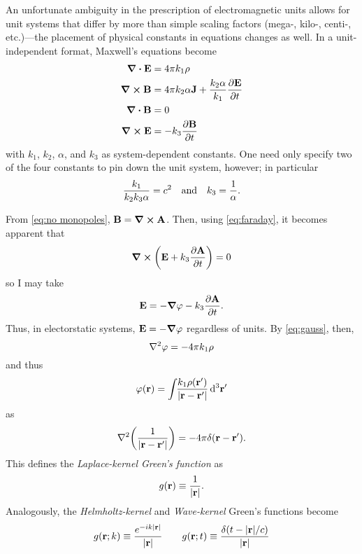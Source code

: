 An unfortunate ambiguity in the prescription of electromagnetic units allows for unit systems that differ by more than simple scaling factors (mega-, kilo-, centi-, etc.)---the placement of physical constants in equations changes as well.
In a unit-independent format, Maxwell's equations become~\cite{jackson2007classical}
\begin{subequations}
  \begin{align}
    \div{\vb{E}} &= 4 \pi k_1 \rho \label{eq:gauss} \\
    \curl{\vb{B}} &= 4 \pi k_2 \alpha \vb{J} + \frac{k_2 \alpha}{k_1} \pdv{\vb{E}}{t} \label{eq:ampere}\\
    \div{\vb{B}} &= 0 \label{eq:no monopoles} \\
    \curl{\vb{E}} &= - k_3 \pdv{\vb{B}}{t} \label{eq:faraday}
  \end{align}
  \label{eq:time-domain maxwell equations}
\end{subequations}
with $k_1$, $k_2$, $\alpha$, and $k_3$ as system-dependent constants. 
One need only specify two of the four constants to pin down the unit system, however; in particular 
\begin{equation}
  \frac{k_1}{k_2 k_3 \alpha} = c^2 \qq{and} k_3 = \frac{1}{\alpha}.
\end{equation}

From \cref{eq:no monopoles}, $\vb{B} = \curl{\vb{A}}$. 
Then, using \cref{eq:faraday}, it becomes apparent that
\begin{equation*}
  \curl{\qty(\vb{E} + k_3 \pdv{\vb{A}}{t})} = 0
\end{equation*}
so I may take
\begin{equation*}
  \vb{E} = -\grad{\varphi} - k_3 \pdv{\vb{A}}{t}.
\end{equation*}
Thus, in electorstatic systems, $\vb{E} = -\grad{\varphi}$ regardless of units.
By \cref{eq:gauss}, then,
\begin{equation*}
  \laplacian \varphi = -4 \pi k_1 \rho
\end{equation*}
and thus
\begin{equation*}
  \varphi(\vb{r}) = \int_{} \kern0.1em \frac{k_1 \rho(\vb{r}')}{\abs{\vb{r} - \vb{r}'}} \dd[3]{\vb{r}'}
\end{equation*}
as
\begin{equation*}
  \laplacian \qty(\frac{1}{\abs{\vb{r} - \vb{r}'}}) = -4 \pi \delta(\vb{r} - \vb{r}').
\end{equation*}
This defines the \emph{Laplace-kernel Green's function} as
\begin{equation}
  g(\vb{r}) \equiv \frac{1}{\abs{\vb{r}}}.
  \label{eq:scalar green}
\end{equation}
Analogously, the \emph{Helmholtz-kernel} and \emph{Wave-kernel} Green's functions become
\begin{equation}
  g(\vb{r}; k) \equiv \frac{e^{-i k \abs{\vb{r}}}}{\abs{\vb{r}}} \qquad
  g(\vb{r}; t) \equiv \frac{\delta(t - \abs{\vb{r}}/c)}{\abs{\vb{r}}}
\end{equation}

